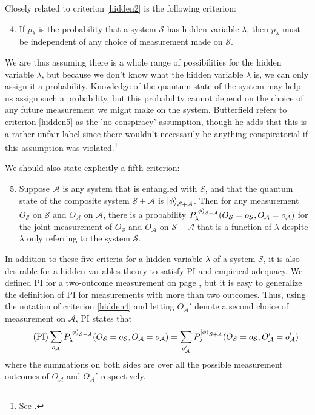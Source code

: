 Closely related to criterion \ref{hidden2} is the following criterion: 
\begin{enumerate}
	\setcounter{enumi}{3}
	\item \label{hidden5} If $p_\lambda$ is the probability that a system $\mathcal{S}$ has hidden variable $\lambda$, then $p_\lambda$ must be independent of any choice of measurement made on $\mathcal{S}$.
\end{enumerate} 
We are thus assuming there is a whole range of possibilities for the hidden variable $\lambda$, but because we don't know what the hidden variable $\lambda$ is, we can only assign it a probability. Knowledge of the quantum state of the system may help us assign such a probability, but this probability cannot depend on the choice of any future measurement we might make on the system. Butterfield refers to criterion \ref{hidden5} as the 'no-conspiracy' assumption, though he adds that this is a rather unfair label since there wouldn't necessarily be anything conspiratorial if this assumption was violated.\footnote{See \cite[34]{Butterfield}.}

We should also state explicitly a fifth criterion:
\begin{enumerate}
	\setcounter{enumi}{4}
	\item \label{hidden4} Suppose  $\mathcal{A}$ is any system that is entangled with $\mathcal{S}$, and that the quantum state of the composite system $\mathcal{S}+\mathcal{A}$  is $\ket{\phi}_{\mathcal{S}+\mathcal{A}}$. Then for any measurement $O_\mathcal{S}$ on $\mathcal{S}$ and $O_\mathcal{A}$ on $\mathcal{A}$, there is a probability $P_\lambda^{\ket{\phi}_{\mathcal{S}+\mathcal{A}}}(O_\mathcal{S}=o_\mathcal{S},O_\mathcal{A}=o_\mathcal{A})$ for the joint measurement of $O_\mathcal{S}$ and $O_\mathcal{A}$ on $\mathcal{S}+\mathcal{A}$ that is a function of $\lambda$  despite $\lambda$ only referring to the system $\mathcal{S}$.	
\end{enumerate}

In addition to these five criteria for a hidden variable $\lambda$ of a system $\mathcal{S}$, it is also desirable for a hidden-variables theory to satisfy PI and empirical adequacy. We defined PI for a two-outcome measurement on page \pageref{PIdef}, but it is easy to generalize the definition of PI for measurements with more than two outcomes. Thus, using the notation of criterion \ref{hidden4} and letting $O_\mathcal{A}'$ denote a second choice of measurement  on $\mathcal{A}$,  PI states that
\begin{equation}\tag{PI}
\sum_{o_\mathcal{A}}P_\lambda^{\ket{\phi}_{\mathcal{S}+\mathcal{A}}}(O_\mathcal{S}=o_\mathcal{S},O_\mathcal{A}=o_\mathcal{A}) = \sum_{o'_\mathcal{A}}P_\lambda^{\ket{\phi}_{\mathcal{S}+\mathcal{A}}}(O_\mathcal{S}=o_\mathcal{S},O'_\mathcal{A}=o'_\mathcal{A}) 
\end{equation}
where the summations on both sides are over all the possible measurement outcomes of $O_\mathcal{A}$ and $O_\mathcal{A}'$ respectively.

